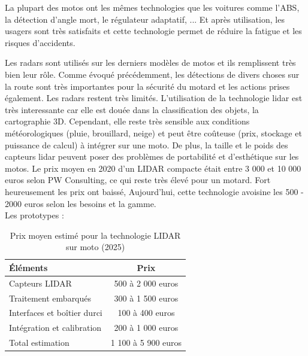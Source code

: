 La plupart des motos ont les mêmes technologies que les voitures comme l'ABS, la détection d'angle mort, le régulateur adaptatif, ... Et après utilisation, les usagers sont très satisfaits et cette technologie permet de réduire la fatigue et les risques d'accidents.

Les radars sont utilisés sur les derniers modèles de  motos et ils remplissent très bien leur rôle. Comme évoqué précédemment, les détections de divers choses sur la route sont très importantes pour la sécurité du motard et les actions prises également. Les radars restent très limités. L'utilisation de la technologie lidar est très interessante car elle est douée dans la classification des objets, la cartographie 3D. Cependant, elle  reste très sensible aux conditions météorologiques (pluie, brouillard, neige) et peut être coûteuse (prix, stockage et puissance de calcul) à intégrer sur une moto. De plus, la taille et le poids des capteurs lidar peuvent poser des problèmes de portabilité et d'esthétique sur les motos. Le prix moyen en 2020 d'un LIDAR compacte était entre 3 000 et 10 000 euros selon PW Consulting\cite{marche_capteur_lidar}, ce qui reste très élevé pour un motard. Fort heureusement les prix ont baissé, Aujourd'hui, cette technologie avoisine les 500 - 2000 euros selon les besoins et la gamme.\\
Les prototypes :\\
\begin{table}[ht]
\centering
\begin{tabular}{|l|c|}
  \hline
  Éléments & Prix \\
  \hline
  Capteurs LIDAR & 500 à 2 000 euros \\
  Traitement embarqués & 300 à 1 500 euros \\
  Interfaces et boîtier durci & 100 à 400 euros \\
  Intégration et calibration & 200 à 1 000 euros \\
  Total estimation & 1 100 à 5 900 euros \\
  \hline
\end{tabular}
\caption{Prix moyen estimé pour la technologie LIDAR sur moto (2025)}
\end{table}

